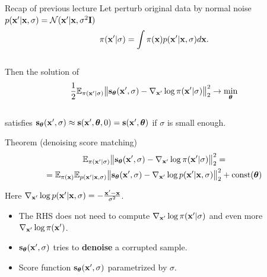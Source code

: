 \begin{frame}{Recap of previous lecture}
	Let perturb original data by normal noise $p(\mathbf{x}' | \mathbf{x}, \sigma) = \mathcal{N}(\mathbf{x}' | \mathbf{x}, \sigma^2 \mathbf{I})$
	\vspace{-0.3cm}
	\[
	\pi(\mathbf{x}' | \sigma) = \int \pi(\mathbf{x}) p(\mathbf{x}' | \mathbf{x}, \sigma) d\mathbf{x}.
	\]
	\vspace{-0.6cm} \\
	Then the solution of 
	\vspace{-0.2cm}
	\[
	\frac{1}{2} \mathbb{E}_{\pi(\mathbf{x}' | \sigma)}\bigl\| \mathbf{s}_{\boldsymbol{\theta}}(\mathbf{x}', \sigma) - \nabla_{\mathbf{x}'} \log \pi(\mathbf{x}' | \sigma) \bigr\|^2_2 \rightarrow \min_{\boldsymbol{\theta}}
	\]
	\vspace{-0.5cm} \\
	satisfies $\mathbf{s}_{\boldsymbol{\theta}}(\mathbf{x}', \sigma) \approx \mathbf{s}(\mathbf{x}', \boldsymbol{\theta}, 0) = \mathbf{s}(\mathbf{x}', \boldsymbol{\theta})$ if $\sigma$ is small enough.
	\begin{block}{Theorem (denoising score matching)}
		\vspace{-0.8cm}
		\begin{multline*}
			\mathbb{E}_{\pi(\mathbf{x}' | \sigma)}\bigl\| \mathbf{s}_{\boldsymbol{\theta}}(\mathbf{x}', \sigma) - \nabla_{\mathbf{x}'} \log \pi(\mathbf{x}' | \sigma) \bigr\|^2_2 = \\ = \mathbb{E}_{\pi(\mathbf{x})} \mathbb{E}_{p(\mathbf{x}' | \mathbf{x}, \sigma)}\bigl\| \mathbf{s}_{\boldsymbol{\theta}}(\mathbf{x}', \sigma) - \nabla_{\mathbf{x}'} \log p(\mathbf{x}' | \mathbf{x}, \sigma) \bigr\|^2_2 + \text{const}(\boldsymbol{\theta})
		\end{multline*}
		\vspace{-0.8cm}
	\end{block}
	Here $\nabla_{\mathbf{x}'} \log p(\mathbf{x}' | \mathbf{x}, \sigma) = - \frac{\mathbf{x}' - \mathbf{x}}{\sigma^2}$.
	\begin{itemize}
		\item The RHS does not need to compute $\nabla_{\mathbf{x}'} \log \pi(\mathbf{x}' | \sigma)$ and even more $\nabla_{\mathbf{x}'} \log \pi(\mathbf{x}')$.
		\item $\mathbf{s}_{\boldsymbol{\theta}}(\mathbf{x}', \sigma)$ tries to \textbf{denoise} a corrupted sample.
		\item Score function $\mathbf{s}_{\boldsymbol{\theta}}(\mathbf{x}', \sigma)$ parametrized by $\sigma$. 
	\end{itemize}
\end{frame}
